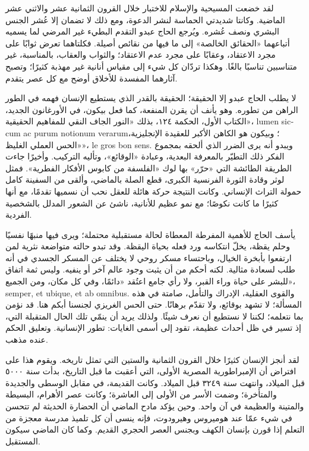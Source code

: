 لقد خضعت المسيحية والإسلام للاختبار خلال القرون الثمانية عشر والاثني عشر الماضية. وكانتا شديدتي الحماسة لنشر الدعوة، ومع ذلك لا تضمان إلا عُشر الجنس البشري ونصف عُشره. ويُرجع الحاج عبدو التقدم البطيء غير المرضي لما يسميه أتباعهما «الحقائق الخالصة» إلى ما فيها من نقائص أصيلة. فكلتاهما تعرض ثوابًا على مجرد الاعتقاد، وعقابًا على مجرد عدم الاعتقاد؛ والثواب والعقاب، بالمناسبة، غير متناسبين تناسبًا بالغًا. وهكذا تردّان كل شيء إلى مقياس أنانية غير مهذبة كثيرًا؛ وتصبح آثارهما المفسدة للأخلاق أوضح مع كل عصر يتقدم.

لا يطلب الحاج عبدو إلا الحقيقة؛ الحقيقة بالقدر الذي يستطيع الإنسان فهمه في الطور الراهن من تطوره. وهو يأنف أن يقرن المنفعة، كما فعل بيكون، في الأورغانون الجديد، الكتاب الأول، الحكمة ١٢٤، بذلك «النور الجاف النقي للمفاهيم الحقيقية»، \textenglish{lumen siccum ac purum notionum verarum}؛ وبيكون هو الكاهن الأكبر للعقيدة الإنجليزية، «الحس العملي الغليظ»، \textenglish{le gros bon sens}. ويبدو أنه يرى الضرر الذي ألحقه بمجموع الفكر ذلك التطيّر بالمعرفة البعدية، وعبادة «الوقائع»، وتأليه التركيب. وأخيرًا جاءت الطريقة الطائشة التي «حرّر» بها لوك «الفلسفة من كابوس الأفكار الفطرية». فمثل لوثر وقادة الثورة الفرنسية الكبرى، قطع الصلة بالماضي، وألقى من السفينة كامل حمولة التراث الإنساني. وكانت النتيجة حركة هائلة للعقل نحب أن نسميها تقدمًا، مع أنها كثيرًا ما كانت نكوصًا؛ مع نمو عظيم للأنانية، ناشئ عن الشعور المدلل بالشخصية الفردية.

يأسف الحاج للأهمية المفرطة المعطاة لحالة مستقبلية محتملة؛ ويرى فيها منبهًا نفسيًا وحلم يقظة، يخلّ انتكاسه ورد فعله بحياة اليقظة. وقد تبدو حالته متواضعة نثرية لمن ارتفعوا بأبخرة الخيال، وباحتساء مسكر روحي لا يختلف عن المسكر الجسدي في أنه طلب لسعادة مثالية. لكنه أحكم من أن يثبت وجود عالم آخر أو ينفيه. وليس ثمة اتفاق للبشر على حياة وراء القبر، ولا رأي جامع اعتُقد «دائمًا، وفي كل مكان، ومن الجميع»، \textenglish{semper, et ubique, et ab omnibus}. والقوى العقلية، الإدراك والتأمل، صامتة في هذه المسألة؛ لا تشهد بوقائع، ولا تقدّم برهانًا. حتى الحس الغريزي لجنسنا أبكم هنا. قد نؤمن بما نتعلمه؛ لكننا لا نستطيع أن نعرف شيئًا. ولذلك يريد أن ينمّي تلك الحال المتقبلة التي، إذ تسير في ظل أحداث عظيمة، تقود إلى أسمى الغايات: تطور الإنسانية. وتعليق الحكم عنده مذهب.

لقد أنجز الإنسان كثيرًا خلال القرون الثمانية والستين التي تمثل تاريخه. ويقوم هذا على افتراض أن الإمبراطورية المصرية الأولى، التي أعقبت ما قبل التاريخ، بدأت سنة ٥٠٠٠ قبل الميلاد، وانتهت سنة ٣٢٤٩ قبل الميلاد. وكانت القديمة، في مقابل الوسطى والجديدة والمتأخرة؛ وضمت الأسر من الأولى إلى العاشرة؛ وكانت عصر الأهرام، البسيطة والمتينة والعظيمة في آن واحد. وحين يؤكد مادح الماضي أن الحضارة الحديثة لم تتحسن في شيء عمّا عند هوميروس وهيرودوت، فإنه ينسى أن كل تلميذ مدرسة معجزة من التعلم إذا قورن بإنسان الكهف وبجنس العصر الحجري القديم. وكما كان الماضي سيكون المستقبل.

